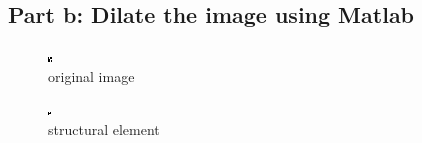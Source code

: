 \documentclass{article}
\begin{document}
	\subsection{Part b: Dilate the image using Matlab}
	\begin{figure}[H]
		\includegraphics[width=\linewidth]{Q6/original.png}
		\caption{original image}
	\end{figure}
	\begin{figure}[H]
		\includegraphics[width=\linewidth]{Q6/SE.png}
		\caption{structural element}
	\end{figure}
\end{document}
